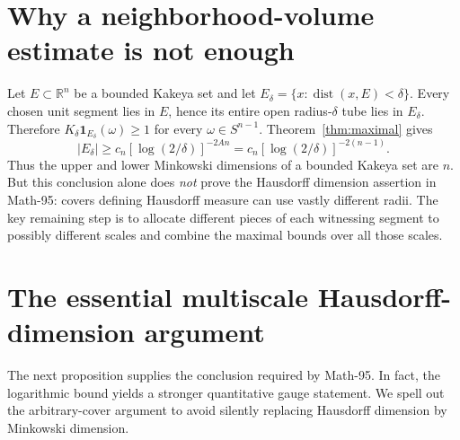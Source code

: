 \documentclass[11pt,a4paper]{article}
\numberwithin{equation}{section}
\theoremstyle{definition}
\theoremstyle{remark}
\newcommand{\R}{\mathbb R}
\newcommand{\one}{\mathbf 1}
\newcommand{\Sph}{S^{n-1}}
\begin{document}
\section{Why a neighborhood-volume estimate is not enough}
\label{sec:minkowski}
Let $E\subset\R^n$ be a bounded Kakeya set and let
$E_\delta=\{x:\operatorname{dist}(x,E)<\delta\}$. Every chosen unit
segment lies in $E$, hence its entire open radius-$\delta$ tube
lies in $E_\delta$. Therefore
$K_\delta\one_{E_\delta}(\omega)\ge1$ for every $\omega\in\Sph$.
Theorem~\ref{thm:maximal} gives
\begin{equation}\label{eq:volume}
 |E_\delta|\ge c_n[\log(2/\delta)]^{-2An}
                =c_n[\log(2/\delta)]^{-2(n-1)}.
\end{equation}
Thus the upper and lower Minkowski dimensions of a bounded Kakeya set
are $n$. But this conclusion alone does \emph{not} prove the
Hausdorff dimension assertion in Math-95: covers defining
Hausdorff measure can use vastly different radii. The key remaining
step is to allocate different pieces of each witnessing segment to
possibly different scales and combine the maximal bounds over all
those scales.

\section{The essential multiscale Hausdorff-dimension argument}
\label{sec:hausdorff}
The next proposition supplies the conclusion required by Math-95.
In fact, the logarithmic bound yields a stronger quantitative gauge
statement. We spell out the arbitrary-cover argument to avoid
silently replacing Hausdorff dimension by Minkowski dimension.
\end{document}
